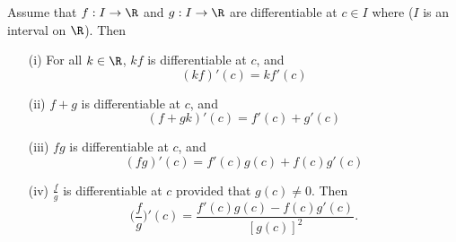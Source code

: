 \begin{theorem}
    Assume that \( f: I \to \R  \) and \( g : I \to \R  \) are differentiable at \( c \in I  \) where (\( I  \) is an interval on \( \R  \)). Then
    \begin{enumerate}
        \item[(i)] For all \( k \in \R  \), \( kf  \) is differentiable at \( c  \), and
            \[  (kf)'(c) = k f'(c) \]
        \item[(ii)] \( f+ g  \) is differentiable at \( c  \), and 
            \[  (f+gk)'(c) = f'(c) + g'(c) \]
        \item[(iii)] \( fg  \) is differentiable at \( c  \), and 
            \[  (fg)'(c) = f'(c) g(c) + f(c) g'(c) \]
        \item[(iv)] \( \frac{ f }{ g }  \) is differentiable at \( c  \) provided that \( g(c) \neq 0  \). Then
            \[  \Big(  \frac{ f }{ g }  \Big)' (c) = \frac{ f'(c) g(c) - f(c) g'(c) }{ [g(c)]^{2} }. \]
    \end{enumerate} 
\end{theorem}


